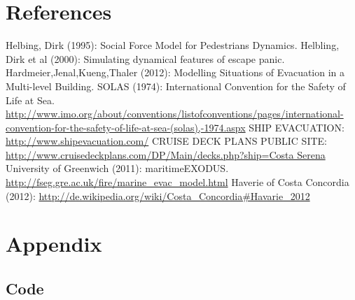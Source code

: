 \documentclass[11pt]{article}
\begin{document}
\section{References}

\begin{thebibliography}{9}
 Helbing, Dirk (1995): Social Force Model for Pedestrians Dynamics.
 Helbling, Dirk et al (2000): Simulating dynamical features of escape panic.
 Hardmeier,Jenal,Kueng,Thaler (2012): Modelling Situations of Evacuation in a Multi-level Building.
 SOLAS (1974): International Convention for the Safety of Life at Sea. \url{http://www.imo.org/about/conventions/listofconventions/pages/international-convention-for-the-safety-of-life-at-sea-(solas),-1974.aspx}
 SHIP EVACUATION: \url{http://www.shipevacuation.com/}
 CRUISE DECK PLANS PUBLIC SITE: \url{http://www.cruisedeckplans.com/DP/Main/decks.php?ship=Costa Serena}
 University of Greenwich (2011):  maritimeEXODUS. \url{http://fseg.gre.ac.uk/fire/marine_evac_model.html}
 Haverie of Costa Concordia (2012): \url{http://de.wikipedia.org/wiki/Costa_Concordia#Havarie_2012}
	
\end{thebibliography}
\section{Appendix}

\subsection{Code}


\end{document}

